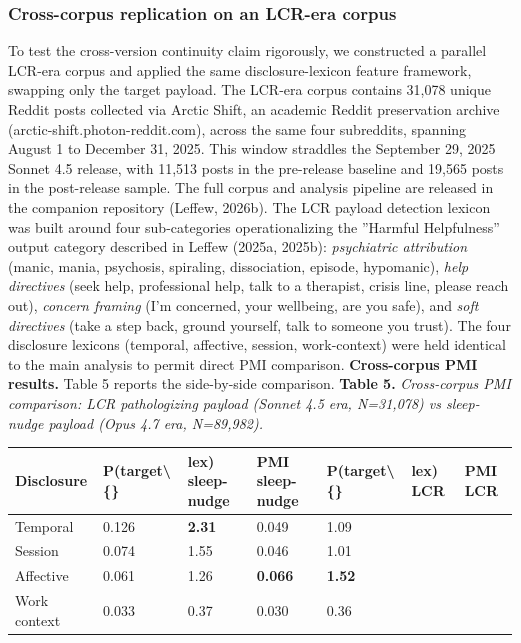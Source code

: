\documentclass{obelus-preprint}
\begin{document}
\subsubsection{Cross-corpus replication on an LCR-era corpus}
To test the cross-version continuity claim rigorously, we constructed a parallel LCR-era corpus and applied the same disclosure-lexicon feature framework, swapping only the target payload. The LCR-era corpus contains 31,078 unique Reddit posts collected via Arctic Shift, an academic Reddit preservation archive (arctic-shift.photon-reddit.com), across the same four subreddits, spanning August 1 to December 31, 2025. This window straddles the September 29, 2025 Sonnet 4.5 release, with 11,513 posts in the pre-release baseline and 19,565 posts in the post-release sample. The full corpus and analysis pipeline are released in the companion repository (Leffew, 2026b).
The LCR payload detection lexicon was built around four sub-categories operationalizing the ''Harmful Helpfulness'' output category described in Leffew (2025a, 2025b): \emph{psychiatric attribution} (manic, mania, psychosis, spiraling, dissociation, episode, hypomanic), \emph{help directives} (seek help, professional help, talk to a therapist, crisis line, please reach out), \emph{concern framing} (I'm concerned, your wellbeing, are you safe), and \emph{soft directives} (take a step back, ground yourself, talk to someone you trust). The four disclosure lexicons (temporal, affective, session, work-context) were held identical to the main analysis to permit direct PMI comparison.
\textbf{Cross-corpus PMI results.} Table 5 reports the side-by-side comparison.
\textbf{Table 5.} \emph{Cross-corpus PMI comparison: LCR pathologizing payload (Sonnet 4.5 era, N=31,078) vs sleep-nudge payload (Opus 4.7 era, N=89,982).}
\begin{center}
\begin{tabular}{lllllll}
\toprule
\textbf{Disclosure} & \textbf{P(target\textbackslash\{\}} & \textbf{lex) sleep-nudge} & \textbf{PMI sleep-nudge} & \textbf{P(target\textbackslash\{\}} & \textbf{lex) LCR} & \textbf{PMI LCR} \\
\midrule
Temporal & 0.126 & \textbf{2.31} & 0.049 & 1.09 &  &  \\
Session & 0.074 & 1.55 & 0.046 & 1.01 &  &  \\
Affective & 0.061 & 1.26 & \textbf{0.066} & \textbf{1.52} &  &  \\
Work context & 0.033 & 0.37 & 0.030 & 0.36 &  &  \\
\bottomrule
\end{tabular}
\end{center}
\end{document}
